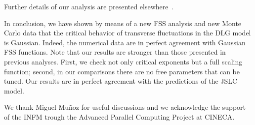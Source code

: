 \documentclass[aps,prl,twocolumn,floatfix,amssymb]{revtex4}
\begin{document}
Further details of our analysis are presented elsewhere~\cite{noi}. 
 
In conclusion, we have shown 
by means of a new FSS analysis and new Monte Carlo data 
that the critical behavior of transverse fluctuations in the DLG model is Gaussian. 
Indeed, the numerical data are in perfect agreement with 
Gaussian FSS functions. Note that our results are stronger than those 
presented in previous analyses. First, we check not only critical exponents 
but a full scaling function; second, in our comparisons 
there are no free parameters that can be tuned. 
Our results are in perfect agreement with the predictions of the JSLC model. 
 
We thank Miguel Mu\~noz  for useful discussions and we acknowledge the
support of the INFM trough the Advanced Parallel Computing Project at CINECA.
 
\end{document}
